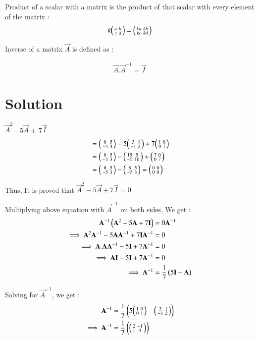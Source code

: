 \documentclass[journal,12pt,twocolumn]{IEEEtran}
\begin{document}
Product of a scalar with a matrix is the product of that scalar with every element of the matrix : 
\begin{align}
 k\begin{psmallmatrix} a & b\\c & d\end{psmallmatrix}  = \begin{psmallmatrix} ka & kb\\kc & kd\end{psmallmatrix}  
\end{align}

Inverse of a matrix $\vec{A}$ is defined as  :
  
\begin{align}
    \vec{A} . \vec{A}^{-1} = \vec{I}
\end{align}

\section{Solution}


 
$\vec{A}^2$ - 5$\vec{A}$ + 7$\vec{I}$ 
\begin{align*}
&=  \begin{psmallmatrix} 8 & 5\\ -5 & 3\end{psmallmatrix} -  5\begin{psmallmatrix} 3 & 1\\ -1 & 2\end{psmallmatrix} + 7\begin{psmallmatrix} 1 & 0\\ 0 & 1\end{psmallmatrix}  \\
&= \begin{psmallmatrix} 8 & 5\\ -5 & 3\end{psmallmatrix} -  \begin{psmallmatrix} 15 & 5\\ -5 & 10\end{psmallmatrix} + \begin{psmallmatrix} 7 & 0\\ 0 & 7\end{psmallmatrix}\\
&= \begin{psmallmatrix} 8 & 5\\ -5 & 3\end{psmallmatrix} - \begin{psmallmatrix} 8 & 5\\ -5 & 3\end{psmallmatrix} = \begin{psmallmatrix} 0 & 0\\ 0 & 0\end{psmallmatrix} 
\end{align*}


Thus, It is proved that $\vec{A}^2 - 5\vec{A} + 7\vec{I} = 0$

Multiplying above equation with $\Vec{A}^{-1}$ on both sides, We get :
\begin{align}
\Vec{A}^{-1}\brak{\vec{A}^2 - 5\vec{A} + 7\vec{I}} &= 0\Vec{A}^{-1} \\
\implies \vec{A}^2\Vec{A}^{-1} - 5\vec{A}\Vec{A}^{-1} + 7\vec{I}\Vec{A}^{-1} &= 0 \\
\implies \vec{A}.\vec{A}\Vec{A}^{-1} - 5\vec{I} + 7\Vec{A}^{-1} &= 0 \\
\implies \vec{A}\vec{I} - 5\vec{I} + 7\Vec{A}^{-1} &= 0\\
\implies \Vec{A}^{-1} &= \frac{1}{7}\brak{5\vec{I} - \vec{A}}
\end{align}

Solving for $\Vec{A}^{-1}$, we get :
\begin{align}
    \Vec{A}^{-1} &= \frac{1}{7}\brak{5\myvec{ 1 & 0\\ 0 & 1} - \myvec{ 3 & 1\\ -1 & 2}} \\
    \implies \Vec{A}^{-1} &= \frac{1}{7}\brak{\myvec{ 2 & -1\\ 1 & 3}}
\end{align}
\end{document}
